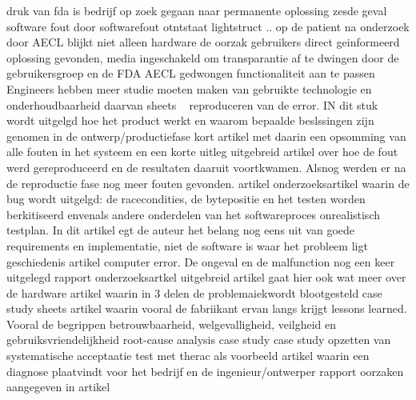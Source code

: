 \begin{description}
	druk van fda is bedrijf op zoek gegaan naar permanente oplossing 
	zesde geval software fout door softwarefout otntstaat lightstruct .. op de patient na onderzoek door AECL 
	blijkt niet alleen hardware de oorzak gebruikers direct geinformeerd oplossing gevonden, media ingeschakeld om transparantie af te dwingen door de gebruikersgroep en de FDA AECL gedwongen functionaliteit aan te passen 
	Engineers hebben meer studie moeten maken van gebruikte technologie en onderhoudbaarheid daarvan 
	sheets
	\cite{rogaway2004therac25}
	~\cite{wikiTherac25}
	reproduceren van de error. IN dit stuk wordt uitgelgd hoe het product werkt en waarom bepaalde beslssingen zijn genomen in de ontwerp/productiefase
	\cite{lynch2017theracRaceConditions}
	kort artikel met daarin een opsomming van alle fouten in het systeem en een korte uitleg
	\cite{lim1998theracdisaster}
	uitgebreid artikel over hoe de fout werd gereproduceerd en de resultaten daaruit voortkwamen. Alsnog werden er na de reproductie fase nog meer fouten gevonden.
	\cite{fabio26102015therac25}
	artikel
	\cite{ethicsunwrappedTherac25}
	onderzoeksartikel waarin de bug wordt uitgelgd: de racecondities, de bytepositie en het testen worden berkitiseerd envenals andere onderdelen van het softwareproces
	onrealistisch testplan. In dit artikel egt de auteur het belang nog eens uit van goede requirements en implementatie, niet de software is waar het probleem ligt
	geschiedenis
	\cite{casesHistoryTherac25}
	artikel
	\cite{caballero2019Therac25}
	computer error. De ongeval en de malfunction nog een keer uitgelegd
	\cite{rose1994theracFatalDose}
	rapport
	\cite{levesonMITTherac25}
	\cite{grant1978theracevaluation}
	onderzoeksartkel
	\cite{turnerTheracAccidentsInvestigations}
	\cite{turner1993TheracAccidentsInvestigations}
	uitgebreid artikel gaat hier ook wat meer over de hardware
	\cite{wang2017industrialdesignengineering}
	artikel waarin in 3 delen de problemaiekwordt blootgesteld
	\cite{levesonturner1993theracpart2}
	case study sheets
	artikel waarin vooral de fabriikant ervan langs krijgt
	\cite{porelloTheraccFailure}
	lessons learned. Vooral de begrippen betrouwbaarheid, welgevalligheid, veilgheid en gebruiksvriendelijkheid
	\cite{theracIncidents}
	root-cause analysis
	case study
	\cite{huffbrown2004casestudyethicatherac}
	case study
	\cite{sebowikimedicalradiation}
	opzetten van systematische acceptaatie test met therac als voorbeeld
	\cite{hsia1995testtherac25}
	artikel waarin een diagnose plaatvindt voor het bedrijf en de ingenieur/ontwerper
	\cite{magsilvaTheracTesting}
	rapport
	oorzaken aangegeven in artikel
	\cite{chemeuropetherac25}

\end{description}
